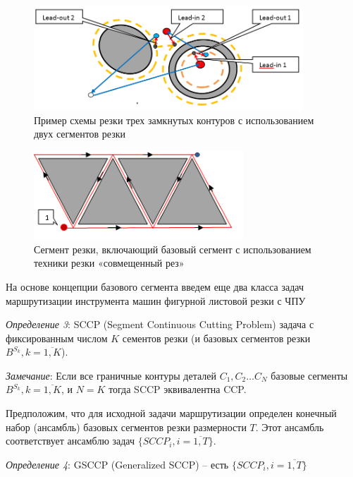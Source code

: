 \documentclass[12pt]{report}
\newcounter{lem}
\begin{document}
\begin{figure}
  \begin{center}
  \includegraphics[width=0.9\textwidth]{cut2-1.png}
  \caption{Пример схемы резки трех замкнутых контуров с использованием двух сегментов резки}
  \label{cut2-1}
  \end{center}
\end{figure}

\begin{figure}
  \begin{center}
  \includegraphics[width=0.7\textwidth]{cut4-3.png}
  \caption{Сегмент резки, включающий базовый сегмент с использованием техники резки «совмещенный рез»}
  \label{cut4-3}
  \end{center}
\end{figure}

На основе концепции базового сегмента введем еще
два класса задач маршрутизации инструмента машин
фигурной листовой резки с ЧПУ

{\it Определение 3}:
SCCP (Segment Continuous Cutting Problem)
задача с фиксированным числом $K$
сементов резки (и базовых сегментов резки
$B^{S_k}, k = \overline{1, K}$).

{\it Замечание}:
Если все граничные контуры деталей
$C_1, C_2 \dots C_N$
базовые сегменты $B^{S_k}, k = \overline{1,K}$,
и $N=K$
тогда SCCP эквивалентна CCP.

Предположим, что для исходной задачи маршрутизации
определен конечный набор (ансамбль)
базовых сегментов резки размерности $T$.
Этот ансамбль соответствует ансамблю задач
$\{SCCP_i, i =\overline{1,T}\}$.

{\it Определение 4}:
GSCCP (Generalized SCCP) -- есть
$\{SCCP_i, i =\overline{1,T}\}$
\end{document}
